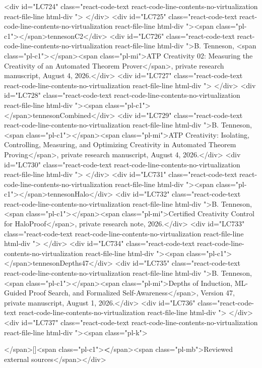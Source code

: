 {{{{{{{<div id="LC724" class="react-code-text react-code-line-contents-no-virtualization react-file-line html-div ">
</div>
<div id="LC725" class="react-code-text react-code-line-contents-no-virtualization react-file-line html-div "><span class="pl-c1">\bibitem</span>{tennesonC2}</div>
<div id="LC726" class="react-code-text react-code-line-contents-no-virtualization react-file-line html-div ">B. Tenneson, <span class="pl-c1">\emph</span>{<span class="pl-mi">ATP Creativity 02: Measuring the Creativity of an Automated Theorem Prover</span>}, private research manuscript, August 4, 2026.</div>
<div id="LC727" class="react-code-text react-code-line-contents-no-virtualization react-file-line html-div ">
</div>
<div id="LC728" class="react-code-text react-code-line-contents-no-virtualization react-file-line html-div "><span class="pl-c1">\bibitem</span>{tennesonCombined}</div>
<div id="LC729" class="react-code-text react-code-line-contents-no-virtualization react-file-line html-div ">B. Tenneson, <span class="pl-c1">\emph</span>{<span class="pl-mi">ATP Creativity: Isolating, Controlling, Measuring, and Optimizing Creativity in Automated Theorem Proving</span>}, private research manuscript, August 4, 2026.</div>
<div id="LC730" class="react-code-text react-code-line-contents-no-virtualization react-file-line html-div ">
</div>
<div id="LC731" class="react-code-text react-code-line-contents-no-virtualization react-file-line html-div "><span class="pl-c1">\bibitem</span>{tennesonHalo}</div>
<div id="LC732" class="react-code-text react-code-line-contents-no-virtualization react-file-line html-div ">B. Tenneson, <span class="pl-c1">\emph</span>{<span class="pl-mi">Certified Creativity Control for HaloProof</span>}, private research note, 2026.</div>
<div id="LC733" class="react-code-text react-code-line-contents-no-virtualization react-file-line html-div ">
</div>
<div id="LC734" class="react-code-text react-code-line-contents-no-virtualization react-file-line html-div "><span class="pl-c1">\bibitem</span>{tennesonDepths47}</div>
<div id="LC735" class="react-code-text react-code-line-contents-no-virtualization react-file-line html-div ">B. Tenneson, <span class="pl-c1">\emph</span>{<span class="pl-mi">Depths of Induction, ML-Guided Proof Search, and Formalized Self-Awareness</span>}, Version 47, private manuscript, August 1, 2026.</div>
<div id="LC736" class="react-code-text react-code-line-contents-no-virtualization react-file-line html-div ">
</div>
<div id="LC737" class="react-code-text react-code-line-contents-no-virtualization react-file-line html-div "><span class="pl-k">\item</span>[]<span class="pl-c1">\textbf</span>{<span class="pl-mb">Reviewed external sources</span>}</div>
}}}}}}}
